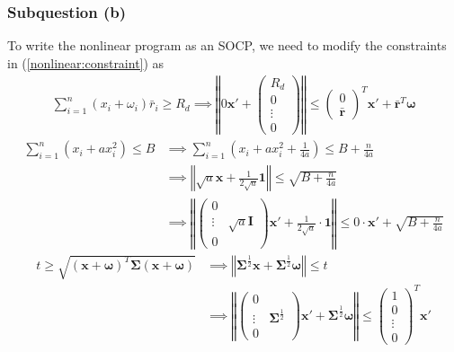 \documentclass[12pt]{ftec2101}
\newcommand{\matr}[1]{\mathbf{#1}}
\newcommand{\vect}[1]{\mathbf{#1}}
\begin{document}
\subsubsection{Subquestion (b)}
To write the nonlinear program as an SOCP, we need to modify the constraints in (\ref{nonlinear:constraint}) as
\begin{align}
    \sum_{i=1}^{n} (x_i + \omega_i)\bar{r}_i \geq R_d \implies \left \Vert 0 \vect{x'} + 
    \begin{pmatrix}
        R_d\\
        0\\
        \vdots\\
        0
    \end{pmatrix} \right \Vert \leq
    \begin{pmatrix}
        0\\
        \bar{\vect{r}}
    \end{pmatrix}^T \vect{x'} + \bar{\vect{r}}^T \boldsymbol{\omega}
\end{align}
\begin{align}
    \sum_{i=1}^{n} (x_i + a x_i^2) \leq B &\implies \sum_{i=1}^{n} \left(x_i + a x_i^2+\frac{1}{4a}\right) \leq B+\frac{n}{4a} \\
    &\implies \left \Vert \sqrt{a} \vect{x} + \frac{1}{2\sqrt{a}} \vect{1}\right \Vert \leq \sqrt{B+\frac{n}{4a}} \\
    &\implies \left \Vert 
    \begin{pmatrix}
        0 & \\
        \vdots & \sqrt{a} \matr{I} \\
        0 & 
    \end{pmatrix}\vect{x'} + \frac{1}{2\sqrt{a}} \cdot \vect{1} \right \Vert \leq 0 \cdot \vect{x'} + \sqrt{B+\frac{n}{4a}}
\end{align}
\begin{align}
    t \geq \sqrt{(\vect{x}+\boldsymbol{\omega})^T \boldsymbol{\Sigma} (\vect{x}+\boldsymbol{\omega})} &\implies \left \Vert \boldsymbol{\Sigma}^{\frac{1}{2}} \vect{x} + \boldsymbol{\Sigma}^{\frac{1}{2}}\boldsymbol{\omega}\right \Vert \leq t \\
    &\implies \left \Vert
    \begin{pmatrix}
        0 & \\
        \vdots & \boldsymbol{\Sigma}^{\frac{1}{2}}\\
        0 & 
    \end{pmatrix} \vect{x'} + \boldsymbol{\Sigma}^{\frac{1}{2}} \boldsymbol{\omega} \right \Vert \leq
    \begin{pmatrix}
        1 \\
        0 \\
        \vdots \\
        0
    \end{pmatrix}^T \vect{x'}
\end{align}
\end{document}
